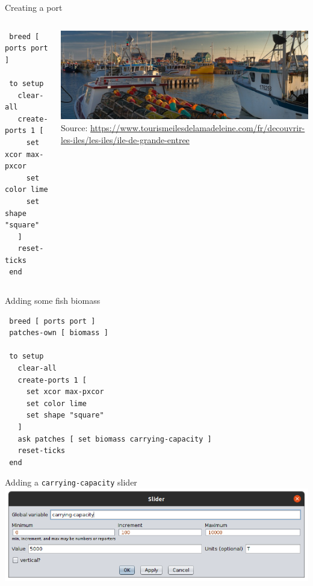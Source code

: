 \documentclass[table, 14pt, aspectratio=169]{beamer}
\begin{document}
\begin{frame}[fragile=singleslide]{Creating a port}
  \begin{columns}
    \begin{column}{0.45\textwidth}
    \small
    \begin{verbatim}
 breed [ ports port ]

 to setup
   clear-all
   create-ports 1 [
     set xcor max-pxcor
     set color lime
     set shape "square"
   ]
   reset-ticks
 end
        \end{verbatim}
    \end{column}
    \begin{column}{0.55\textwidth}
      \includegraphics[width=\textwidth]{images/port.jpg}\\
      \tiny Source: \url{https://www.tourismeilesdelamadeleine.com/fr/decouvrir-les-iles/les-iles/ile-de-grande-entree}
    \end{column}
  \end{columns}
\end{frame}

\begin{frame}[fragile=singleslide]{Adding some fish biomass}\small
  \begin{verbatim}
 breed [ ports port ]
 patches-own [ biomass ]
 
 to setup
   clear-all
   create-ports 1 [
     set xcor max-pxcor
     set color lime
     set shape "square"
   ]
   ask patches [ set biomass carrying-capacity ]
   reset-ticks
 end
  \end{verbatim}  
\end{frame}

\begin{frame}{Adding a \texttt{carrying-capacity} slider}
  \centering\vfill
  \includegraphics[width=\linewidth]{images/carrying_capacity_slider.png}
  \vfill
\end{frame}
\end{document}
